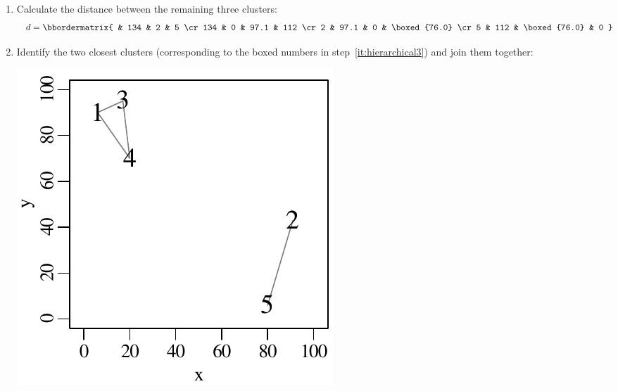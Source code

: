 \begin{enumerate}
\item\label{it:hierarchical3} Calculate the distance between the
  remaining three clusters:
  \begin{equation*}
    d = \bbordermatrix{ & 134 & 2 & 5 \cr
      134 & 0 & 97.1 & 112 \cr
      2 & 97.1 & 0 & \boxed{76.0} \cr
      5 & 112 & \boxed{76.0} & 0
    }
  \end{equation*}  
  
\item Identify the two closest clusters (corresponding to the boxed
  numbers in step~\ref{it:hierarchical3}) and join them together:

  \begin{minipage}[t][][b]{.3\linewidth}
  \includegraphics[width=\linewidth]{../figures/hierarchical4.pdf}\medskip
  \end{minipage}
  \begin{minipage}[t][][b]{.3\linewidth}

\end{minipage}
\end{enumerate}
